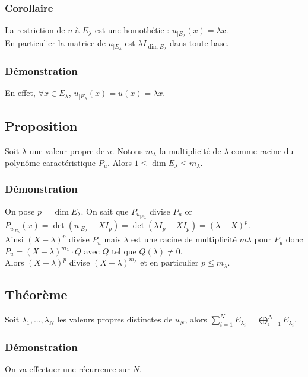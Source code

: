 \documentclass[a4paper,10pt]{book} %
\newcommand{\displayAmath}{\displaystyle}
\begin{document}
\subsubsection{Corollaire}
La restriction de $u$ à $E_\lambda$ est une homothétie : $u_{|E_\lambda}(x)=\lambda x$.\\

En particulier la matrice de $u_{|E_\lambda}$ est $\lambda I_{\dim E_\lambda}$ dans toute base.

\subsubsection{Démonstration}
En effet, $\forall x\in E_\lambda$, $u_{|E_\lambda}(x)=u(x)=\lambda x$.

\newpage

\subsection{Proposition}
Soit $\lambda$ une valeur propre de $u$. Notons $m_\lambda$ la multiplicité de $\lambda$ comme racine du polynôme caractéristique $P_u$. Alors $1\leq \dim E_\lambda\leq m_\lambda$.

\subsubsection{Démonstration}
On pose $p=\dim E_\lambda$. On sait que $P_{u_{|E_\lambda}}$ divise $P_u$ or\\$P_{u_{|E_\lambda}}(x)=\det(u_{|E_\lambda}-X I_p)=\det(\lambda I_p-X I_p)=(\lambda-X)^p$.\\

Ainsi $(X-\lambda)^p$ divise $P_u$ mais $\lambda$ est une racine de multiplicité $m\lambda$ pour $P_u$ donc\\ $P_u=(X-\lambda)^{m_\lambda}\cdot Q$ avec $Q$ tel que $Q(\lambda)\neq 0$.\\

Alors $(X-\lambda)^p$ divise $(X-\lambda)^{m_\lambda}$ et en particulier $p\leq m_\lambda$.

\subsection{Théorème}
Soit $\lambda_1,...,\lambda_N$ les valeurs propres distinctes de $u_N$, alors $\displayAmath\sum_{i=1}^NE_{\lambda_i}=\bigoplus_{i=1}^N E_{\lambda_i}$.

\subsubsection{Démonstration}
On va effectuer une récurrence sur $N$.\\
\end{document}

